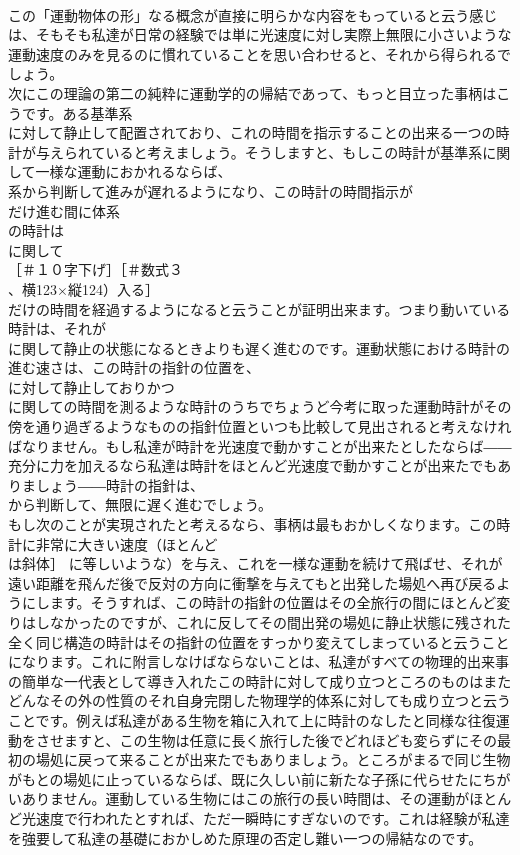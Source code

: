 \documentclass[8pt]{extreport}
\begin{document}
\begin{CJK}{UTF8}{min}
\\	この「運動物体の形」なる概念が直接に明らかな内容をもっていると云う感じは、そもそも私達が日常の経験では単に光速度に対し実際上無限に小さいような運動速度のみを見るのに慣れていることを思い合わせると、それから得られるでしょう。
\\	次にこの理論の第二の純粋に運動学的の帰結であって、もっと目立った事柄はこうです。ある基準系 
\\	に対して静止して配置されており、これの時間を指示することの出来る一つの時計が与えられていると考えましょう。そうしますと、もしこの時計が基準系に関して一様な運動におかれるならば、
\\	系から判断して進みが遅れるようになり、この時計の時間指示が 
\\	だけ進む間に体系 
\\	の時計は 
\\	に関して
\\	［＃１０字下げ］［＃数式３
\\	、横123×縦124）入る］
\\	だけの時間を経過するようになると云うことが証明出来ます。つまり動いている時計は、それが 
\\	に関して静止の状態になるときよりも遅く進むのです。運動状態における時計の進む速さは、この時計の指針の位置を、
\\	に対して静止しておりかつ 
\\	に関しての時間を測るような時計のうちでちょうど今考に取った運動時計がその傍を通り過ぎるようなものの指針位置といつも比較して見出されると考えなければなりません。もし私達が時計を光速度で動かすことが出来たとしたならば――充分に力を加えるなら私達は時計をほとんど光速度で動かすことが出来たでもありましょう――時計の指針は、
\\	から判断して、無限に遅く進むでしょう。
\\	もし次のことが実現されたと考えるなら、事柄は最もおかしくなります。この時計に非常に大きい速度（ほとんど 
\\	は斜体］ に等しいような）を与え、これを一様な運動を続けて飛ばせ、それが遠い距離を飛んだ後で反対の方向に衝撃を与えてもと出発した場処へ再び戻るようにします。そうすれば、この時計の指針の位置はその全旅行の間にほとんど変りはしなかったのですが、これに反してその間出発の場処に静止状態に残された全く同じ構造の時計はその指針の位置をすっかり変えてしまっていると云うことになります。これに附言しなけばならないことは、私達がすべての物理的出来事の簡単な一代表として導き入れたこの時計に対して成り立つところのものはまたどんなその外の性質のそれ自身完閉した物理学的体系に対しても成り立つと云うことです。例えば私達がある生物を箱に入れて上に時計のなしたと同様な往復運動をさせますと、この生物は任意に長く旅行した後でどれほども変らずにその最初の場処に戻って来ることが出来たでもありましょう。ところがまるで同じ生物がもとの場処に止っているならば、既に久しい前に新たな子孫に代らせたにちがいありません。運動している生物にはこの旅行の長い時間は、その運動がほとんど光速度で行われたとすれば、ただ一瞬時にすぎないのです。これは経験が私達を強要して私達の基礎におかしめた原理の否定し難い一つの帰結なのです。

\end{CJK}
\end{document}
